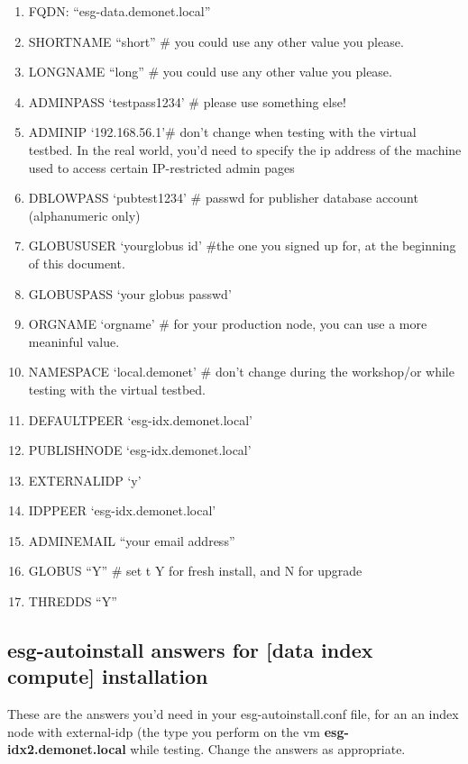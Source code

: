 \begin{enumerate}
\def\labelenumi{\arabic{enumi}.}
\item
  FQDN: ``esg-data.demonet.local''
\item
  SHORTNAME ``short'' \# you could use any other value you please.
\item
  LONGNAME ``long'' \# you could use any other value you please.
\item
  ADMINPASS `testpass1234' \# please use something else!
\item
  ADMINIP `192.168.56.1'\# don't change when testing with the virtual testbed. In the real world, you'd need to specify the ip address of the machine used to access certain IP-restricted admin pages
\item
  DBLOWPASS `pubtest1234' \# passwd for publisher database account
  (alphanumeric only)
\item
  GLOBUSUSER `yourglobus id' \#the one you signed up for, at the
  beginning of this document.
\item
  GLOBUSPASS `your globus passwd'
\item
  ORGNAME `orgname' \# for your production node, you can use a more
  meaninful value.
\item
  NAMESPACE `local.demonet' \# don't change during the workshop/or while testing with the virtual testbed.
\item
  DEFAULTPEER `esg-idx.demonet.local'
\item
  PUBLISHNODE `esg-idx.demonet.local'
\item
  EXTERNALIDP `y'
\item
  IDPPEER `esg-idx.demonet.local'
\item
  ADMINEMAIL ``your email address''
\item
  GLOBUS ``Y'' \# set t Y for fresh install, and N for upgrade
\item
  THREDDS ``Y''
\end{enumerate}

\subsection{esg-autoinstall answers for [data index compute] installation}

These are the answers you'd need in your esg-autoinstall.conf file, for an an index node with external-idp (the type you perform on the vm \textbf{esg-idx2.demonet.local} while testing.
Change the answers as appropriate.

